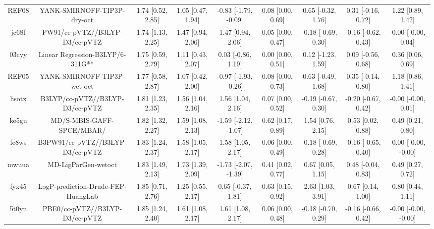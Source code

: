\documentclass{article}
\begin{document}
\begin{center}
\begin{longtable}{|ccccccccc|}
 REF08 &                        YANK-SMIRNOFF-TIP3P-dry-oct &  1.74 [0.52, 2.85] &  1.05 [0.47, 1.94] &  -0.83 [-1.79, -0.09] &  0.08 [0.00, 0.69] &   0.65 [-0.32, 1.76] &   0.31 [-0.16, 0.72] &     1.22 [0.89, 1.42] \\
 jc68f &                     PW91/cc-pVTZ//B3LYP-D3/cc-pVTZ &  1.74 [1.13, 2.25] &  1.47 [0.94, 2.06] &     1.47 [0.94, 2.06] &  0.05 [0.00, 0.47] &  -0.18 [-0.69, 0.30] &  -0.16 [-0.62, 0.43] &   -0.00 [-0.00, 0.04] \\
 03cyy &                   Linear Regression-B3LYP/6-311G** &  1.75 [0.59, 2.79] &  1.11 [0.43, 2.07] &    0.03 [-0.86, 1.19] &  0.00 [0.00, 0.51] &   0.12 [-1.23, 1.59] &   0.09 [-0.56, 0.68] &     0.36 [0.06, 0.69] \\
 REF05 &                        YANK-SMIRNOFF-TIP3P-wet-oct &  1.77 [0.58, 2.87] &  1.07 [0.42, 2.00] &  -0.97 [-1.93, -0.26] &  0.08 [0.00, 0.73] &   0.63 [-0.49, 1.68] &   0.35 [-0.14, 0.80] &     1.18 [0.86, 1.41] \\
 hsotx &                    B3LYP/cc-pVTZ//B3LYP-D3/cc-pVTZ &  1.81 [1.23, 2.35] &  1.56 [1.04, 2.16] &     1.56 [1.04, 2.16] &  0.07 [0.00, 0.52] &  -0.19 [-0.67, 0.30] &  -0.20 [-0.67, 0.42] &   -0.00 [-0.00, 0.01] \\
 ke5gu &                          MD/S-MBIS-GAFF-SPCE/MBAR/ &  1.82 [1.32, 2.27] &  1.59 [1.08, 2.13] &  -1.59 [-2.12, -1.07] &  0.62 [0.17, 0.89] &    1.54 [0.76, 2.15] &    0.53 [0.02, 0.88] &     0.49 [0.21, 0.80] \\
 fe8ws &                   B3PW91/cc-pVTZ//B3LYP-D3/cc-pVTZ &  1.83 [1.24, 2.37] &  1.58 [1.05, 2.17] &     1.58 [1.05, 2.17] &  0.06 [0.00, 0.49] &  -0.18 [-0.69, 0.28] &  -0.16 [-0.65, 0.40] &  -0.00 [-0.00, -0.00] \\
 mwuua &                                MD-LigParGen-wetoct &  1.83 [1.49, 2.13] &  1.73 [1.39, 2.09] &  -1.73 [-2.07, -1.39] &  0.41 [0.02, 0.77] &    0.67 [0.05, 1.15] &   0.48 [-0.04, 0.83] &     0.49 [0.27, 0.72] \\
 fyx45 &                 LogP-prediction-Drude-FEP-HuangLab &  1.85 [0.71, 2.76] &  1.25 [0.55, 2.17] &    0.65 [-0.37, 1.81] &  0.63 [0.15, 0.92] &    2.63 [1.03, 3.91] &    0.67 [0.14, 1.00] &     0.80 [0.44, 1.11] \\
 5t0yn &                     PBE0/cc-pVTZ//B3LYP-D3/cc-pVTZ &  1.85 [1.24, 2.40] &  1.61 [1.08, 2.17] &     1.61 [1.08, 2.17] &  0.06 [0.00, 0.48] &  -0.18 [-0.70, 0.29] &  -0.16 [-0.66, 0.42] &  -0.00 [-0.00, -0.00] \\

\end{longtable}
\end{center}
\end{document}
